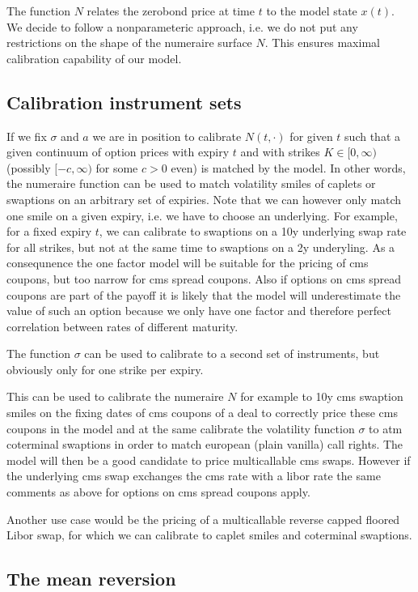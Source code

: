 \documentclass{amsart}
\theoremstyle{plain}
\numberwithin{equation}{section}
\begin{document}
The function $N$ relates the zerobond price at time $t$ to the model state $x(t)$. We decide to
follow a nonparameteric approach, i.e. we do not put any restrictions on the shape of the numeraire surface $N$. This ensures maximal calibration
capability of our model.

\subsection{Calibration instrument sets}

If we fix $\sigma$ and $a$ we are in position to calibrate $N(t,\cdot)$ for given $t$ such that a given continuum of option prices with expiry $t$ and
with strikes $K \in [0,\infty)$ (possibly $[-c,\infty)$ for some $c>0$ even)  is matched by the model. In other words,  the numeraire function can be used to match volatility smiles of caplets or
swaptions on an arbitrary set of expiries. Note that we can however only match one smile on a given expiry, i.e. we have to choose an underlying. For
example, for a fixed expiry $t$, we can calibrate to swaptions on a 10y underlying swap rate for all strikes, but not at the same time to swaptions on a
2y underyling. As a consequnence the one factor model will be suitable for the pricing of cms coupons, but too narrow for cms spread coupons. Also if options on cms spread coupons are part of the payoff it is likely that the model will underestimate the value of such an option because we only have one factor and therefore perfect correlation between rates of different maturity.

The function $\sigma$ can be used to calibrate to a second set of instruments, but obviously only for one strike per expiry.

This can be used to calibrate the numeraire $N$ for example to 10y cms swaption smiles on the fixing dates of cms coupons of a deal to correctly price these cms coupons in the model and at the same calibrate the volatility function $\sigma$ to atm coterminal swaptions in order to match european (plain vanilla) call rights. The model will then be a good candidate to price multicallable cms swaps. However if the underlying cms swap exchanges the cms rate with a libor rate the same comments as above for options on cms spread coupons apply.

Another use case would be the pricing of a multicallable reverse capped floored Libor swap, for which we can calibrate to caplet smiles and coterminal swaptions.

\subsection{The  mean reversion}
\end{document}
